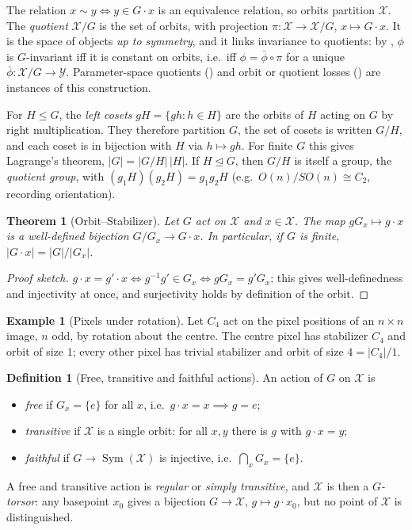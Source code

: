 \documentclass[11pt]{article}
\theoremstyle{plain}
\newtheorem{Theorem}{Theorem}[section]
\theoremstyle{definition}
\newtheorem{Definition}{Definition}[section]
\newtheorem{Example}{Example}[section]
\begin{document}
The relation $x\sim y \iff y\in G\cdot x$ is an equivalence relation, so orbits partition $\mathcal{X}$.
The \emph{quotient} $\mathcal{X}/G$ is the set of orbits, with projection $\pi: \mathcal{X}\to\mathcal{X}/G$, $x\mapsto G\cdot x$.
It is the space of objects \emph{up to symmetry}, and it links invariance to quotients: by , $\phi$ is $G$-invariant iff it is constant on orbits, i.e.\ iff $\phi = \bar\phi\circ\pi$ for a unique $\bar\phi : \mathcal{X}/G\to\mathcal{Y}$.
Parameter-space quotients () and orbit or quotient losses () are instances of this construction.

For $H\leq G$, the \emph{left cosets} $gH = \{gh : h\in H\}$ are the orbits of $H$ acting on $G$ by right multiplication.
They therefore partition $G$, the set of cosets is written $G/H$, and each coset is in bijection with $H$ via $h\mapsto gh$.
For finite $G$ this gives Lagrange's theorem, $|G| = |G/H|\,|H|$.
If $H\trianglelefteq G$, then $G/H$ is itself a group, the \emph{quotient group}, with $(g_1H)(g_2H) = g_1g_2H$ (e.g.\ $O(n)/SO(n)\cong C_2$, recording orientation).

\begin{Theorem}[Orbit--Stabilizer]\label{thm:orbit-stabilizer}
Let $G$ act on $\mathcal{X}$ and $x\in\mathcal{X}$. The map $gG_x\mapsto g\cdot x$ is a well-defined bijection $G/G_x\to G\cdot x$. In particular, if $G$ is finite, $|G\cdot x| = |G|/|G_x|$.
\end{Theorem}
\begin{proof}[Proof sketch]
$g\cdot x = g'\cdot x \iff g^{-1}g'\in G_x \iff gG_x = g'G_x$; this gives well-definedness and injectivity at once, and surjectivity holds by definition of the orbit.
\end{proof}

\begin{Example}[Pixels under rotation]\label{ex:orbit-stabilizer-pixels}
Let $C_4$ act on the pixel positions of an $n\times n$ image, $n$ odd, by rotation about the centre.
The centre pixel has stabilizer $C_4$ and orbit of size $1$; every other pixel has trivial stabilizer and orbit of size $4 = |C_4|/1$.
\end{Example}

\begin{Definition}[Free, transitive and faithful actions]\label{def:free-transitive}
An action of $G$ on $\mathcal{X}$ is
\begin{itemize}
    \item \emph{free} if $G_x = \{e\}$ for all $x$, i.e.\ $g\cdot x = x\implies g=e$;
    \item \emph{transitive} if $\mathcal{X}$ is a single orbit: for all $x,y$ there is $g$ with $g\cdot x = y$;
    \item \emph{faithful} if $G\to\operatorname{Sym}(\mathcal{X})$ is injective, i.e.\ $\bigcap_{x}G_x = \{e\}$.
\end{itemize}
A free and transitive action is \emph{regular} or \emph{simply transitive}, and $\mathcal{X}$ is then a \emph{$G$-torsor}: any basepoint $x_0$ gives a bijection $G\to\mathcal{X}$, $g\mapsto g\cdot x_0$, but no point of $\mathcal{X}$ is distinguished.
\end{Definition}
\end{document}
